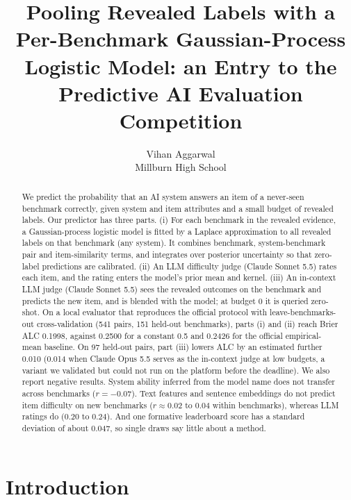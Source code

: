 \documentclass{article}
\title{Pooling Revealed Labels with a Per-Benchmark Gaussian-Process Logistic Model: an Entry to the Predictive AI Evaluation Competition}
\author{%
  Vihan Aggarwal\\
  Millburn High School\\
}
\begin{document}
\maketitle

\begin{abstract}
We predict the probability that an AI system answers an item of a never-seen benchmark correctly,
given system and item attributes and a small budget of revealed labels. Our predictor has three
parts. (i) For each benchmark in the revealed evidence, a Gaussian-process logistic model is fitted
by a Laplace approximation to all revealed labels on that benchmark (any system). It combines
benchmark, system-benchmark pair and item-similarity terms, and integrates over posterior
uncertainty so that zero-label predictions are calibrated. (ii) An LLM difficulty judge (Claude
Sonnet 5.5) rates each item, and the rating enters the model's prior mean and kernel. (iii) An
in-context LLM judge (Claude Sonnet 5.5) sees the revealed outcomes on the benchmark and predicts
the new item, and is blended with the model; at budget 0 it is queried zero-shot. On a local evaluator that reproduces the official protocol with
leave-benchmarks-out cross-validation (541 pairs, 151 held-out benchmarks), parts (i) and (ii) reach
Brier ALC 0.1998, against 0.2500 for a constant 0.5 and 0.2426 for the official empirical-mean
baseline. On 97 held-out pairs, part (iii) lowers ALC by an estimated further 0.010 (0.014 when
Claude Opus 5.5 serves as the in-context judge at low budgets, a variant we validated but could not
run on the platform before the deadline). We also report
negative results. System ability inferred from the model name does not transfer across benchmarks
($r=-0.07$). Text features and sentence embeddings do not predict item difficulty on new benchmarks
($r\approx0.02$ to $0.04$ within benchmarks), whereas LLM ratings do ($0.20$ to $0.24$). And one
formative leaderboard score has a standard deviation of about 0.047, so single draws say little about
a method.
\end{abstract}

\section{Introduction}
\end{document}

